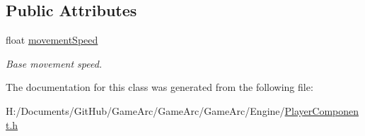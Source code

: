 \subsection*{Public Attributes}
\begin{DoxyCompactItemize}
\item 
\hypertarget{class_player_component_ac3e853e9e00be90dfebbc3d06d445257}{float \hyperlink{class_player_component_ac3e853e9e00be90dfebbc3d06d445257}{movement\+Speed}}\label{class_player_component_ac3e853e9e00be90dfebbc3d06d445257}

\begin{DoxyCompactList}\small\item\em Base movement speed. \end{DoxyCompactList}\end{DoxyCompactItemize}


The documentation for this class was generated from the following file\+:\begin{DoxyCompactItemize}
\item 
H\+:/\+Documents/\+Git\+Hub/\+Game\+Arc/\+Game\+Arc/\+Game\+Arc/\+Engine/\hyperlink{_player_component_8h}{Player\+Component.\+h}\end{DoxyCompactItemize}
